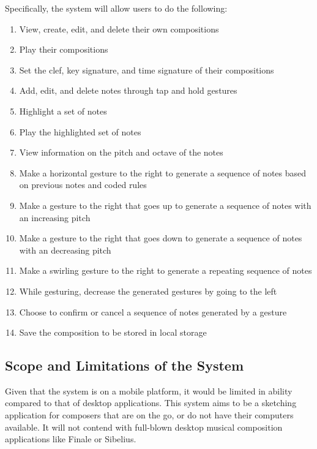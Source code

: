     	Specifically, the system will allow users to do the following: 
          \begin{enumerate}
              \item View, create, edit, and delete their own compositions
              \item Play their compositions
              \item Set the clef, key signature, and time signature of their 								compositions
              \item Add, edit, and delete notes through tap and hold gestures
              \item Highlight a set of notes
              \item Play the highlighted set of notes
              \item View information on the pitch and octave of the notes
              \item Make a horizontal gesture to the right to generate a sequence of 						notes based on previous notes and coded rules
              \item Make a gesture to the right that goes up to generate a sequence of 						notes with an increasing pitch
              \item Make a gesture to the right that goes down to generate a sequence of 						notes with an decreasing pitch
              \item Make a swirling gesture to the right to generate a repeating 							sequence of notes
              \item While gesturing, decrease the generated gestures by going to the 						left
              \item Choose to confirm or cancel a sequence of notes generated by a 							gesture
              \item Save the composition to be stored in local storage    

          \end{enumerate}
    
\subsection{Scope and Limitations of the System}

Given that the system is on a mobile platform, it would be limited in ability compared to that of desktop applications. This system aims to be a sketching application for composers that are on the go, or do not have their computers available. It will not contend with full-blown desktop musical composition applications like Finale or Sibelius.

